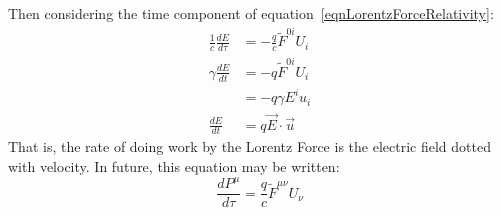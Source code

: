 \documentclass[../Main.tex]{subfiles}
\begin{document}
Then considering the time component of equation~\ref{eqnLorentzForceRelativity}:
\begin{align*}
    \frac{1}{c} \frac{dE}{d\tau} &= -\frac{q}{c} \tilde{F}^{0i} U_i \\
    \gamma \frac{dE}{dt} &= -q \tilde{F}^{0i} U_i \\
    &= -q\gamma E^i u_i \\
    \frac{dE}{dt} &= q \vec{E} \cdot \vec{u}
\end{align*}
That is, the rate of doing work by the Lorentz Force is the electric field dotted with velocity.
In future, this equation may be written:
\begin{equation}
    \frac{dP^\mu}{d\tau} = \frac{q}{c} \tilde{F}^{\mu \nu} U_\nu
    \label{eqnLorentzRateOfWork}
\end{equation}
\end{document}
